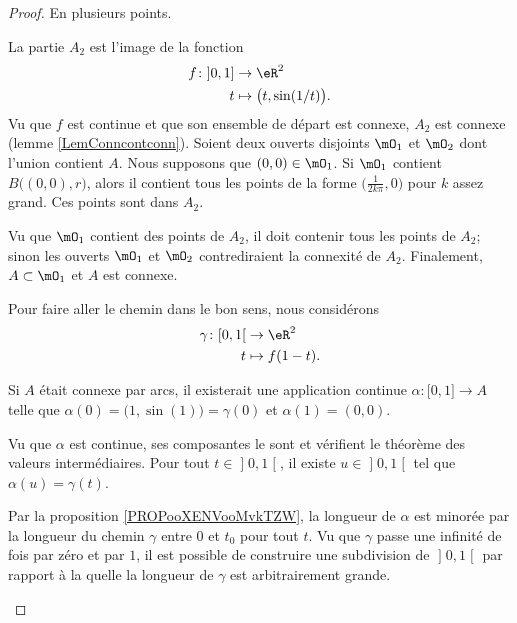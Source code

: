 \begin{proof}
	En plusieurs points.
	\begin{subproof}
		La partie \( A_2\) est l'image de la fonction
		\begin{equation}
			\begin{aligned}
				f\colon \mathopen] 0 , 1 \mathclose] & \to \eR^2                        \\
				t                                    & \mapsto \big( t,\sin(1/t) \big).
			\end{aligned}
		\end{equation}
		Vu que \( f\) est continue et que son ensemble de départ est connexe, \( A_2\) est connexe (lemme \ref{LemConncontconn}).
		Soient deux ouverts disjoints \( \mO_1\) et \( \mO_2\) dont l'union contient \( A\). Nous supposons que \( (0,0)\in \mO_1\). Si \( \mO_1\) contient \( B\big( (0,0),r \big)\), alors il contient tous les points de la forme \( \big( \frac{1}{ 2k\pi },0 \big)\) pour \( k\) assez grand. Ces points sont dans \( A_2\).

		Vu que \( \mO_1\) contient des points de \( A_2\), il doit contenir tous les points de \( A_2\); sinon les ouverts \( \mO_1\) et \( \mO_2\) contrediraient la connexité de \( A_2\). Finalement, \( A\subset \mO_1\) et \( A\) est connexe.

		Pour faire aller le chemin dans le bon sens, nous considérons
		\begin{equation}
			\begin{aligned}
				\gamma\colon \mathopen[ 0 , 1 \mathclose[ & \to \eR^2       \\
				t                                         & \mapsto f(1-t).
			\end{aligned}
		\end{equation}

		Si \( A\) était connexe par arcs, il existerait une application continue \( \alpha\colon \mathopen[ 0 , 1 \mathclose]\to A\) telle que \( \alpha(0)=\big( 1,\sin(1) \big)=\gamma(0)\) et \( \alpha(1)=(0,0)\).

		Vu que \( \alpha\) est continue, ses composantes le sont et vérifient le théorème des valeurs intermédiaires. Pour tout \( t\in \mathopen] 0 , 1 \mathclose[\), il existe \( u\in \mathopen] 0 , 1 \mathclose[\) tel que \( \alpha(u)=\gamma(t)\).

			Par la proposition \ref{PROPooXENVooMvkTZW}, la longueur de \( \alpha\) est minorée par la longueur du chemin \( \gamma\) entre \( 0\) et \( t_0\) pour tout \( t\).
			Vu que \( \gamma\) passe une infinité de fois par zéro et par \( 1\), il est possible de construire une subdivision de \( \mathopen] 0 , 1 \mathclose[\) par rapport à la quelle la longueur de \( \gamma\) est arbitrairement grande.


\end{subproof}
\end{proof}
